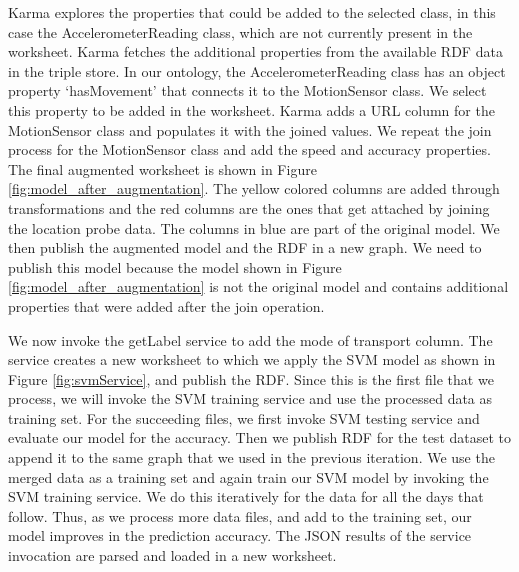 Karma explores the properties that could be added to the selected class, in this case the AccelerometerReading class, which are not currently present in the worksheet. Karma fetches the additional properties from the available RDF data in the triple store. In our ontology, the AccelerometerReading class has an object property `hasMovement' that connects it to the MotionSensor class. We select this property to be added in the worksheet. Karma adds a URL column for the MotionSensor class and populates it with the joined values. We repeat the join process for the MotionSensor class and add the speed and accuracy properties. The final augmented worksheet is shown in Figure \ref{fig:model_after_augmentation}. The yellow colored columns are added through transformations and the red columns are the ones that get attached by joining the location probe data. The columns in blue are part of the original model. We then publish the augmented model and the RDF in a new graph. We need to publish this model because the model shown in Figure \ref{fig:model_after_augmentation} is not the original model and contains additional properties that were added after the join operation. 

We now invoke the getLabel service to add the mode of transport column. The service creates a new worksheet to which we apply the SVM model as shown in Figure \ref{fig:svmService}, and publish the RDF. Since this is the first file that we process, we will invoke the SVM training service and use the processed data as training set. For the succeeding files, we first invoke SVM testing service and evaluate our model for the accuracy. Then we publish RDF for the test dataset to append it to the same graph that we used in the previous iteration. We use the merged data as a training set and again train our SVM model by invoking the SVM training service. We do this iteratively for the data for all the days that follow. Thus, as we process more data files, and add to the training set, our model improves in the prediction accuracy. The JSON results of the service invocation are parsed and loaded in a new worksheet. 